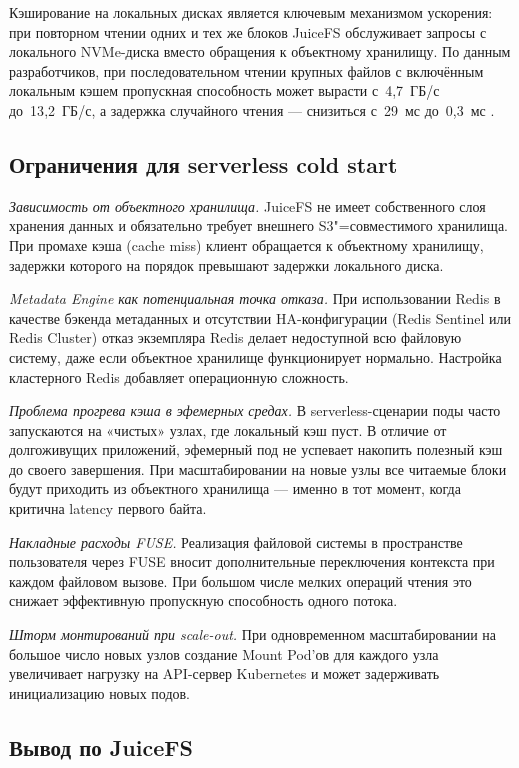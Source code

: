 Кэширование на локальных дисках является ключевым механизмом ускорения: при повторном чтении одних и тех же блоков JuiceFS обслуживает запросы с локального NVMe-диска вместо обращения к объектному хранилищу. По данным разработчиков, при последовательном чтении крупных файлов с включённым локальным кэшем пропускная способность может вырасти с~4{,}7~ГБ/с до~13{,}2~ГБ/с, а задержка случайного чтения --- снизиться с~29~мс до~0{,}3~мс \cite{juicefs_perf}.

\subsection*{Ограничения для serverless cold start}

\textit{Зависимость от объектного хранилища.} JuiceFS не имеет собственного слоя хранения данных и обязательно требует внешнего S3"=совместимого хранилища. При промахе кэша (cache miss) клиент обращается к объектному хранилищу, задержки которого на порядок превышают задержки локального диска.

\textit{Metadata Engine как потенциальная точка отказа.} При использовании Redis в качестве бэкенда метаданных и отсутствии HA-конфигурации (Redis Sentinel или Redis Cluster) отказ экземпляра Redis делает недоступной всю файловую систему, даже если объектное хранилище функционирует нормально. Настройка кластерного Redis добавляет операционную сложность.

\textit{Проблема прогрева кэша в эфемерных средах.} В serverless-сценарии поды часто запускаются на «чистых» узлах, где локальный кэш пуст. В отличие от долгоживущих приложений, эфемерный под не успевает накопить полезный кэш до своего завершения. При масштабировании на новые узлы все читаемые блоки будут приходить из объектного хранилища --- именно в тот момент, когда критична latency первого байта.

\textit{Накладные расходы FUSE.} Реализация файловой системы в пространстве пользователя через FUSE вносит дополнительные переключения контекста при каждом файловом вызове. При большом числе мелких операций чтения это снижает эффективную пропускную способность одного потока.

\textit{Шторм монтирований при scale-out.} При одновременном масштабировании на большое число новых узлов создание Mount Pod'ов для каждого узла увеличивает нагрузку на API-сервер Kubernetes и может задерживать инициализацию новых подов.

\subsection*{Вывод по JuiceFS}

